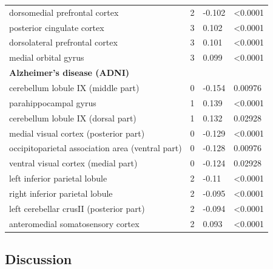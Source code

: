 \documentclass{article}
\begin{document}
\begin{table}
\begin{tabular}{p{}p{}p{}p{}}
dorsomedial prefrontal cortex & 2 & -0.102 & \textless 0.0001 \\
posterior cingulate cortex & 3 & 0.102 & \textless 0.0001 \\
dorsolateral prefrontal cortex & 3 & 0.101 & \textless 0.0001 \\
medial orbital gyrus & 3 & 0.099 & \textless 0.0001 \\
\textbf{Alzheimer's disease (ADNI)} &  &  &  \\
cerebellum lobule IX (middle part) & 0 & -0.154 & 0.00976 \\
parahippocampal gyrus & 1 & 0.139 & \textless 0.0001 \\
cerebellum lobule IX (dorsal part) & 1 & 0.132 & 0.02928 \\
medial visual cortex (posterior part) & 0 & -0.129 & \textless 0.0001 \\
occipitoparietal association area (ventral part) & 0 & -0.128 & 0.00976 \\
ventral visual cortex (medial part) & 0 & -0.124 & 0.02928 \\
left inferior parietal lobule & 2 & -0.11 & \textless 0.0001 \\
right inferior parietal lobule & 2 & -0.095 & \textless 0.0001 \\
left cerebellar crusII (posterior part) & 2 & -0.094 & \textless 0.0001 \\
anteromedial somatosensory cortex & 2 & 0.093 & \textless 0.0001 \\
\bottomrule
\end{tabular}
\end{table}

\subsection{Discussion}\label{Discussion}
\end{document}
